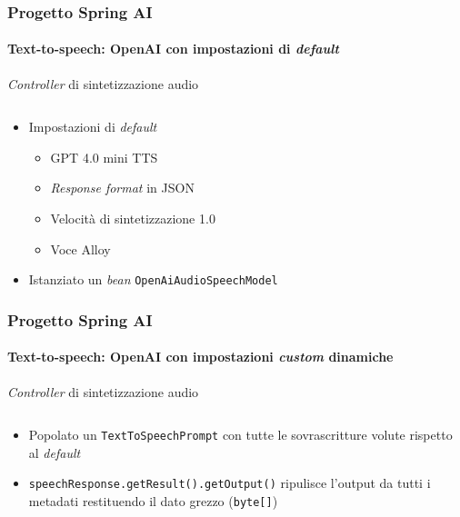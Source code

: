 %
\begin{frame}[t,fragile] \frametitle{Progetto Spring AI}
    \framesubtitle{Text-to-speech: OpenAI con impostazioni di \textit{default}}
    	\vspace*{-.7cm}
        \begin{block}{\textit{Controller} di sintetizzazione audio}
			{\tiny\inputminted{java}{code/AudioController.java}}
    	\end{block}
        \begin{itemize}[leftmargin=10pt,align=right]
            \item[\alert{\faArrowCircleRight}] Impostazioni di \textit{default}
            \begin{itemize}[leftmargin=10pt,align=right]
                \item[\alert{\faArrowCircleRight}] GPT 4.0 mini TTS
                \item[\alert{\faArrowCircleRight}] \textit{Response format} in JSON
                \item[\alert{\faArrowCircleRight}] Velocità di sintetizzazione 1.0
                \item[\alert{\faArrowCircleRight}] Voce Alloy
            \end{itemize}
            \item[\alert{\faArrowCircleRight}] Istanziato un \textit{bean} \alert{\texttt{OpenAiAudioSpeechModel}}
        \end{itemize}      
\end{frame}
%
\begin{frame}[t,fragile] \frametitle{Progetto Spring AI}
    \framesubtitle{Text-to-speech: OpenAI con impostazioni \textit{custom} dinamiche}
    	\vspace*{-.7cm}
        \begin{block}{\textit{Controller} di sintetizzazione audio}
			{\tiny\inputminted{java}{code/AudioControllerCustom.java}}
    	\end{block}
        \begin{itemize}[leftmargin=10pt,align=right]
            \item[\alert{\faArrowCircleRight}] Popolato un \alert{\texttt{TextToSpeechPrompt}} con tutte le sovrascritture volute rispetto al \textit{default}     
            \item[\alert{\faArrowCircleRight}] \alert{\texttt{speechResponse.getResult().getOutput()}} ripulisce l'output da tutti i metadati restituendo il dato grezzo (\texttt{byte[]})
        \end{itemize}         
\end{frame}
